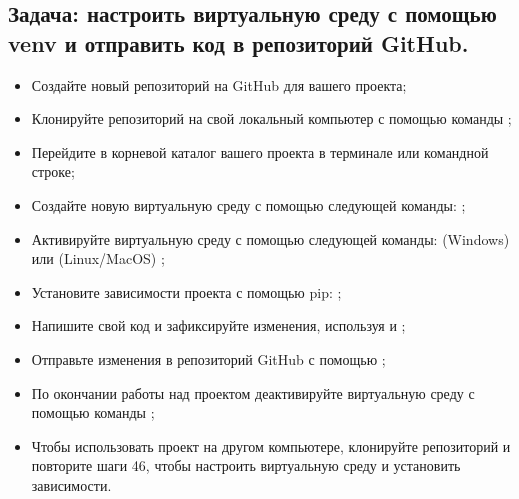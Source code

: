 \documentclass[letterpaper,10pt,russian]{sphinxmanual}
\begin{document}
\subsection{Задача: настроить виртуальную среду с помощью venv и отправить код в репозиторий GitHub.}
\label{\detokenize{educational_materials/path_venv/exercises:venv-github}}\begin{itemize}
\item {} 
\sphinxAtStartPar
Создайте новый репозиторий на GitHub для вашего проекта;

\item {} 
\sphinxAtStartPar
Клонируйте репозиторий на свой локальный компьютер с помощью команды ;

\item {} 
\sphinxAtStartPar
Перейдите в корневой каталог вашего проекта в терминале или командной строке;

\item {} 
\sphinxAtStartPar
Создайте новую виртуальную среду с помощью следующей команды: ;

\item {} 
\sphinxAtStartPar
Активируйте виртуальную среду с помощью следующей команды: (Windows)  или (Linux/MacOS) ;

\item {} 
\sphinxAtStartPar
Установите зависимости проекта с помощью pip: ;

\item {} 
\sphinxAtStartPar
Напишите свой код и зафиксируйте изменения, используя  и ;

\item {} 
\sphinxAtStartPar
Отправьте изменения в репозиторий GitHub с помощью ;

\item {} 
\sphinxAtStartPar
По окончании работы над проектом деактивируйте виртуальную среду с помощью команды ;

\item {} 
\sphinxAtStartPar
Чтобы использовать проект на другом компьютере, клонируйте репозиторий и повторите шаги 4\textendash{}6, чтобы настроить виртуальную среду и установить зависимости.

\end{itemize}
\end{document}
